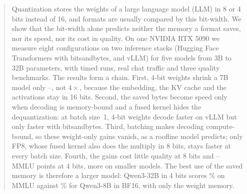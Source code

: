 \begin{abstract}
Quantization stores the weights of a large language model (LLM) in 8 or 4 bits instead of 16, and
formats are usually compared by this bit-width. We show that the bit-width alone predicts neither the
memory a format saves, nor its speed, nor its cost in quality. On one NVIDIA RTX 5090 we measure eight
configurations on two inference stacks (Hugging Face Transformers with bitsandbytes, and vLLM) for five
models from 3B to 32B parameters, with \NumMeasurements{} timed runs, real chat traffic and three
quality benchmarks. The results form a chain. First, 4-bit weights shrink a 7B model only
\WtNFSeven--\WtAWQSeven, not $4\times$, because the embedding, the KV cache and the activations stay
in 16 bits. Second, the saved bytes become speed only when decoding is memory-bound and a fused kernel
hides the dequantization: at batch size~1, 4-bit weights decode \AWQspeedup{} faster on vLLM but only
\NFsevenB{} faster with bitsandbytes. Third, batching makes decoding compute-bound, so these
weight-only gains vanish, as a roofline model predicts; only FP8, whose fused kernel also does
the multiply in 8 bits, stays faster at every batch size. Fourth, the gains cost little quality at 8 bits and
\MFourAbsMin--\MFourAbsMax{} MMLU points at 4 bits, more on smaller models. The best use of the saved
memory is therefore a larger model: Qwen3-32B in 4 bits scores \BigMMLUawq\% on MMLU against
\SmallMMLUbf\% for Qwen3-8B in BF16, with only \BigMemRatio{} the weight memory.
\end{abstract}
